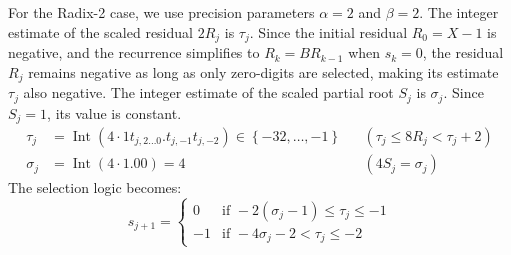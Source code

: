 \documentclass{article}
\DeclareMathOperator{\Int}{Int}
\begin{document}
For the Radix-2 case, we use precision parameters $\alpha = 2$ and $\beta = 2$.
The integer estimate of the scaled residual $2 R_j$ is $\tau_j$.
Since the initial residual $R_0 = X - 1$ is negative, and the recurrence simplifies to $R_k = B R_{k-1}$ when $s_k = 0$, the residual $R_j$ remains negative as long as only zero-digits are selected, making its estimate $\tau_j$ also negative.
The integer estimate of the scaled partial root $S_j$ is $\sigma_j$.
Since $S_j = 1$, its value is constant.
\begin{align}
  \label{eq:sqrt:radix2_tau_special}
  \tau_j &= \Int(4 \cdot 1t_{j,2\ldots0}.t_{j,-1}t_{j,-2}) \in \left\{-32, \dots, -1\right\} && (\tau_j \leq 8 R_j < \tau_j + 2) \\
  \label{eq:sqrt:radix2_sigma_special}
  \sigma_j &= \Int(4 \cdot 1.00) = 4 && (4 S_j = \sigma_j)
\end{align}
The selection logic becomes:
\begin{equation}
  \label{eq:sqrt:radix2_logic_special}
  s_{j+1} =
  \begin{cases}
    0  & \text{if } -2 (\sigma_j - 1) \leq \tau_j \leq -1 \\
    -1 & \text{if } -4 \sigma_j - 2 < \tau_j \leq -2
  \end{cases}
\end{equation}
\end{document}
